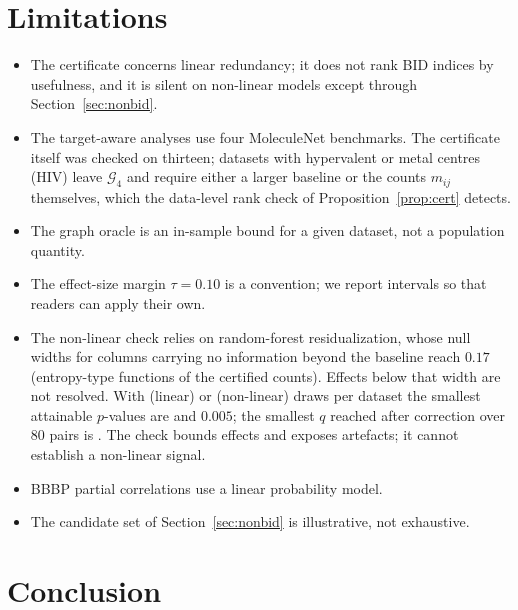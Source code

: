 \documentclass[11pt,a4paper]{article}
\theoremstyle{definition}
\newcommand{\Gc}{\mathcal{G}}
\begin{document}
\section{Limitations}\label{sec:limitations}

\begin{itemize}
\item The certificate concerns linear redundancy; it does not rank
BID indices by usefulness, and it is silent on non-linear models
except through Section~\ref{sec:nonbid}.
\item The target-aware analyses use four MoleculeNet benchmarks. The
certificate itself was checked on thirteen; datasets with hypervalent
or metal centres (HIV) leave $\Gc_4$ and require either a larger
baseline or the counts $m_{ij}$ themselves, which the data-level rank
check of Proposition~\ref{prop:cert} detects.
\item The graph oracle is an in-sample bound for a given dataset, not
a population quantity.
\item The effect-size margin $\tau=0.10$ is a convention; we report
intervals so that readers can apply their own.
\item The non-linear check relies on random-forest residualization,
whose null widths for columns carrying no information beyond the
baseline reach $0.17$ (entropy-type functions of the certified counts).
Effects below that width are not resolved. With \nullKB{} (linear) or
\nullKC{} (non-linear) draws per dataset the smallest attainable
$p$-values are \nullPmin{} and $0.005$; the smallest $q$ reached after
correction over $80$ pairs is \qFourBbbp. The check bounds effects and
exposes artefacts; it cannot establish a non-linear signal.
\item BBBP partial correlations use a linear probability model.
\item The candidate set of Section~\ref{sec:nonbid} is illustrative,
not exhaustive.
\end{itemize}

\section{Conclusion}\label{sec:conclusion}
\end{document}
